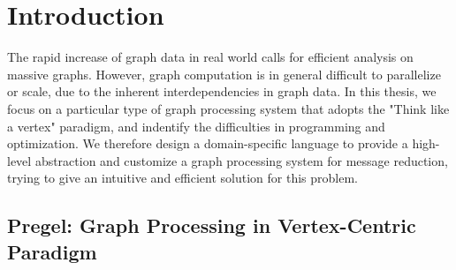 \documentclass{sokendai_thesis} %
\begin{document}

\mainmatter

\chapter{Introduction}

The rapid increase of graph data in real world calls for efficient analysis on massive graphs.
However, graph computation is in general difficult to parallelize or scale, due to the inherent interdependencies in graph data.
In this thesis, we focus on a particular type of graph processing system that adopts the "Think like a vertex" paradigm, and indentify the difficulties in programming and optimization.
We therefore design a domain-specific language to provide a high-level abstraction and customize a graph processing system for message reduction, trying to give an intuitive and efficient solution for this problem.

\section{Pregel: Graph Processing in Vertex-Centric Paradigm}
\end{document}
